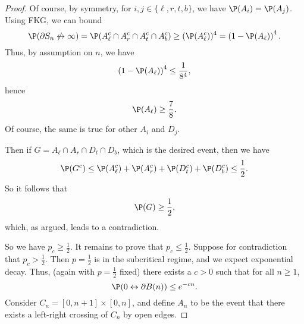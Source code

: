 \documentclass[a4paper]{article}
\begin{document}
\begin{proof}
  Of course, by symmetry, for $i, j \in \{\ell, r, t, b\}$, we have $\P(A_i) = \P(A_j)$. Using FKG, we can bound
  \[
    \P(\partial S_n \not\leftrightarrow \infty) = \P (A_\ell^c \cap A_r^c \cap A_t^c \cap A_b^c) \geq (\P(A_\ell^c))^4 = \left(1 - \P(A_\ell)\right)^4.
  \]
  Thus, by assumption on $n$, we have
  \[
    \left(1 - \P(A_\ell)\right)^{4} \leq \frac{1}{8^4},
  \]
  hence
  \[
    \P (A_\ell) \geq \frac{7}{8}.
  \]
  Of course, the same is true for other $A_i$ and $D_j$.

  Then if $G = A_\ell \cap A_r \cap D_t \cap D_b$, which is the desired event, then we have
  \[
    \P (G^c) \leq \P(A_\ell^c) + \P(A_r^c) + \P(D_t^c) + \P(D_b^c) \leq \frac{1}{2}.
  \]
  So it follows that
  \[
    \P(G) \geq \frac{1}{2},
  \]
  which, as argued, leads to a contradiction.

%

  So we have $p_c \geq \frac{1}{2}$. It remains to prove that $p_c \leq \frac{1}{2}$. Suppose for contradiction that $p_c > \frac{1}{2}$. Then $p = \frac{1}{2}$ is in the subcritical regime, and we expect exponential decay. Thus, (again with $p = \frac{1}{2}$ fixed) there exists a $c > 0$ such that for all $n \geq 1$,
  \[
    \P(0 \leftrightarrow \partial B(n)) \leq e^{-cn}.
  \]
  Consider $C_n = [0, n + 1] \times [0, n]$, and define $A_n$ to be the event that there exists a left-right crossing of $C_n$ by open edges.


\end{proof}
\end{document}
